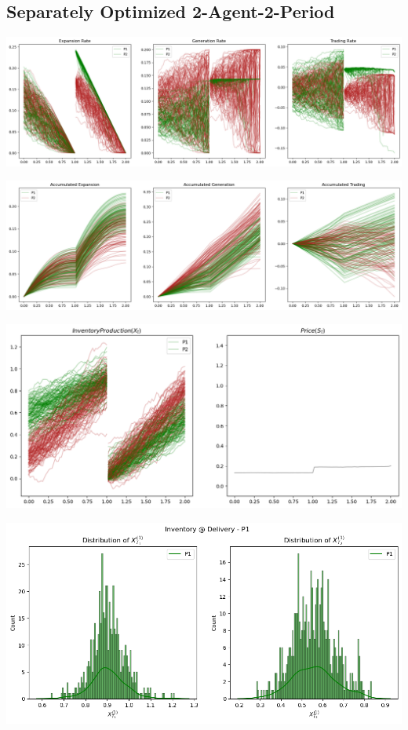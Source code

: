 \documentclass{article}
\begin{document}
{\hypertarget{separately-optimized-2-agent-2-period}{%
\subsection{Separately Optimized
2-Agent-2-Period}\label{separately-optimized-2-agent-2-period}}

\Centering
\includegraphics[width=10\linewidth]{Illustration_Diagrams/Seprt-2A2P-Sigmoid-ResExamples/Rates.png}

\includegraphics{Illustration_Diagrams/Seprt-2A2P-Sigmoid-ResExamples/AccumRates.png}

\includegraphics{Illustration_Diagrams/Seprt-2A2P-Sigmoid-ResExamples/InvAndPrice.png}

\includegraphics{Illustration_Diagrams/Seprt-2A2P-Sigmoid-ResExamples/InvPreDeli_P1.png}

}
\end{document}
